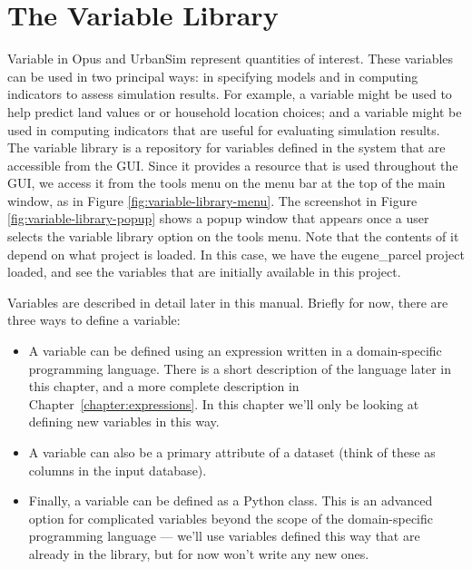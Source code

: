 \chapter{The Variable Library}
\label{chap:variable-library}

Variable in Opus and UrbanSim represent quantities of interest.  These
variables can be used in two principal ways: in specifying models and in
computing indicators to assess simulation results.  For example, a
 variable might be used to help predict land
values or or household location choices; and a 
variable might be used in computing indicators that are useful for
evaluating simulation results.  The variable library is a repository for
variables defined in the system that are accessible from the GUI\@.  Since
it provides a resource that is used throughout the GUI, we access it from
the tools menu on the menu bar at the top of the main window, as in Figure
\ref{fig:variable-library-menu}.  The screenshot in Figure
\ref{fig:variable-library-popup} shows a popup window that appears once a
user selects the variable library option on the tools menu.  Note that the
contents of it depend on what project is loaded.  In this case, we have the
eugene\_parcel project loaded, and see the variables that are initially
available in this project.

Variables are described in detail later in this manual.
Briefly for now, there are three ways to define a variable:

\begin{itemize}

\item A variable can be defined using an expression written in a
  domain-specific programming language.  There is a short description of
  the language later in this chapter, and a more complete description in
  Chapter~\ref{chapter:expressions}.  In this chapter 
  we'll only be looking at defining new variables in this way.

\item A variable can also be a primary attribute of a dataset (think of
  these as columns in the input database).

\item Finally, a variable can be defined as a Python class.  This is an
  advanced option for complicated variables beyond the scope of the
  domain-specific programming language --- we'll use variables defined this
  way that are already in the library, but for now won't write any new ones.

\end{itemize}

